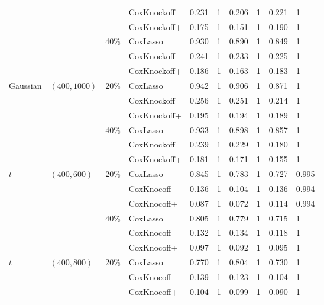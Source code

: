 \documentclass[11pt]{article}
\begin{document}
\begin{center}
\begin{table*}[h!]
{\begin{tabular}{llll cl cl cl}
			&             &         & CoxKnockoff  & 0.231  & 1  & 0.206  & 1  & 0.221   & 1  \\
			&             &         & CoxKnockoff+ & 0.175  & 1  & 0.151  & 1  & 0.190   & 1  \\
			&             & 40$\%$  & CoxLasso     & 0.930  & 1  & 0.890  & 1  & 0.849   & 1 \\
			&             &         & CoxKnockoff  & 0.241  & 1  & 0.233  & 1  & 0.225   & 1 \\
			&             &         & CoxKnockoff+ & 0.186  & 1  & 0.163  & 1  & 0.183   & 1  \\
			\midrule
			Gaussian	&$(400,1000)$ & 20$\%$ & CoxLasso     & 0.942  & 1  & 0.906  & 1  & 0.871   & 1  \\
			&             &        & CoxKnockoff  & 0.256  & 1  & 0.251  & 1  & 0.214   & 1  \\
			&             &        & CoxKnockoff+ & 0.195  & 1  & 0.194  & 1  & 0.189   & 1  \\
			&             & 40$\%$ & CoxLasso     & 0.933  & 1  & 0.898  & 1  & 0.857   & 1 \\
			&             &        & CoxKnockoff  & 0.239  & 1  & 0.229  & 1  & 0.180   & 1 \\
			&             &        & CoxKnockoff+ & 0.181  & 1  & 0.171  & 1  & 0.155   & 1  \\			
			\midrule
			$t$  & $(400,600)$ & 20$\%$  & CoxLasso    & 0.845  & 1    & 0.783   & 1      & 0.727   & 0.995 \\
			&             &         & CoxKnocoff  & 0.136  & 1    & 0.104   & 1      & 0.136   & 0.994 \\
			&             &         & CoxKnocoff+ & 0.087  & 1    & 0.072   & 1      & 0.114   & 0.994 \\
			&             & 40$\%$  & CoxLasso    & 0.805  & 1    & 0.779   & 1      & 0.715   & 1 \\
			&             &         & CoxKnocoff  & 0.132  & 1    & 0.134   & 1      & 0.118   & 1 \\
			&             &         & CoxKnocoff+ & 0.097  & 1    & 0.092   & 1      & 0.095   & 1 \\ 	 
			\midrule
			$t$   & $(400,800)$ & 20$\%$  & CoxLasso    & 0.770  & 1    & 0.804  & 1  & 0.730   & 1  \\
			&             &         & CoxKnocoff  & 0.139  & 1    & 0.123  & 1  & 0.104   & 1 \\
			&             &         & CoxKnocoff+ & 0.104  & 1    & 0.099  & 1  & 0.090   & 1 \\

\end{tabular}}
\end{table*}
\end{center}
\end{document}
